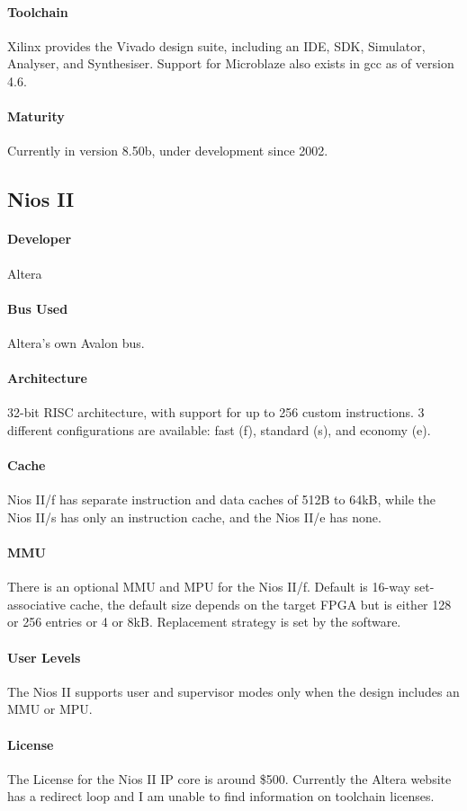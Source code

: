 \documentclass[11pt]{article} %
\begin{document}
\paragraph{Toolchain} Xilinx provides the Vivado design suite, including an IDE, SDK, Simulator, Analyser, and Synthesiser. Support for Microblaze also exists in gcc as of version 4.6.
\paragraph{Maturity} Currently in version 8.50b, under development since 2002.

\subsection{Nios II}
\paragraph{Developer} Altera
\paragraph{Bus Used} Altera's own Avalon bus.
\paragraph{Architecture} 32-bit RISC architecture, with support for up to 256 custom instructions. 3 different configurations are available: fast (f), standard (s), and economy (e).
\paragraph{Cache} Nios II/f has separate instruction and data caches of 512B to 64kB, while the Nios II/s has only an instruction cache, and the Nios II/e has none.
\paragraph{MMU} There is an optional MMU and MPU for the Nios II/f. Default is 16-way set-associative cache, the default size depends on the target FPGA but is either 128 or 256 entries or 4 or 8kB. Replacement strategy is set by the software.
\paragraph{User Levels} The Nios II supports user and supervisor modes only when the design includes an MMU or MPU.
\paragraph{License} The License for the Nios II IP core is around \$500. Currently the Altera website has a redirect loop and I am unable to find information on toolchain licenses.
\end{document}
